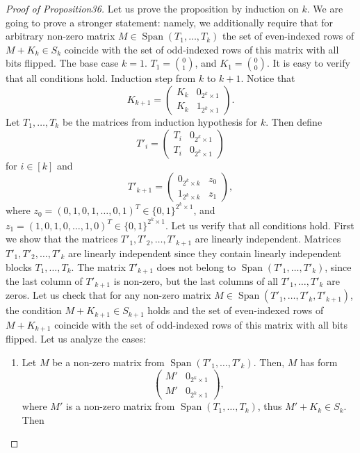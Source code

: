 \begin{proof}[Proof of Proposition36]
Let us prove the proposition by induction on $k$. We are going to prove a stronger statement: namely, we additionally require that for arbitrary non-zero matrix $M\in\operatorname{Span}(T_1,\ldots,T_k)$ the set of even-indexed rows of $M+K_k\in S_k$ coincide with the set of odd-indexed rows of this matrix with all bits flipped.
The base case $k=1$. $T_1=\binom01$, and $K_1=\binom00$. It is easy to verify that all conditions hold.
Induction step from $k$ to $k+1$. Notice that
\[
K_{k+1}=\begin{pmatrix}K_k&0_{2^k\times1}\\K_k&1_{2^k\times1}\end{pmatrix}.
\]
Let $T_1,\ldots,T_k$ be the matrices from induction hypothesis for $k$. Then define
\[
T'_i=\begin{pmatrix}T_i&0_{2^k\times1}\\T_i&0_{2^k\times1}\end{pmatrix}
\]
for $i\in[k]$ and
\[
T'_{k+1}=\begin{pmatrix}0_{2^k\times k}&z_0\\1_{2^k\times k}&z_1\end{pmatrix},
\]
where $z_0=(0,1,0,1,\ldots,0,1)^T\in\{0,1\}^{2^k\times1}$, and $z_1=(1,0,1,0,\ldots,1,0)^T\in\{0,1\}^{2^k\times1}$.
Let us verify that all conditions hold. First we show that the matrices $T'_1,T'_2,\ldots,T'_{k+1}$ are linearly independent. Matrices $T'_1,T'_2,\ldots,T'_k$ are linearly independent since they contain linearly independent blocks $T_1,\ldots,T_k$. The matrix $T'_{k+1}$ does not belong to $\operatorname{Span}(T'_1,\ldots,T'_k)$, since the last column of $T'_{k+1}$ is non-zero, but the last columns of all $T'_1,\ldots,T'_k$ are zeros.
Let us check that for any non-zero matrix $M\in\operatorname{Span}(T'_1,\ldots,T'_k,T'_{k+1})$, the condition $M+K_{k+1}\in S_{k+1}$ holds and the set of even-indexed rows of $M+K_{k+1}$ coincide with the set of odd-indexed rows of this matrix with all bits flipped. Let us analyze the cases:
\begin{enumerate}
\item Let $M$ be a non-zero matrix from $\operatorname{Span}(T'_1,\ldots,T'_k)$. Then, $M$ has form
\[
\begin{pmatrix}M'&0_{2^k\times1}\\M'&0_{2^k\times1}\end{pmatrix},
\]
where $M'$ is a non-zero matrix from $\operatorname{Span}(T_1,\ldots,T_k)$, thus $M'+K_k\in S_k$. Then

\end{enumerate}
\end{proof}
